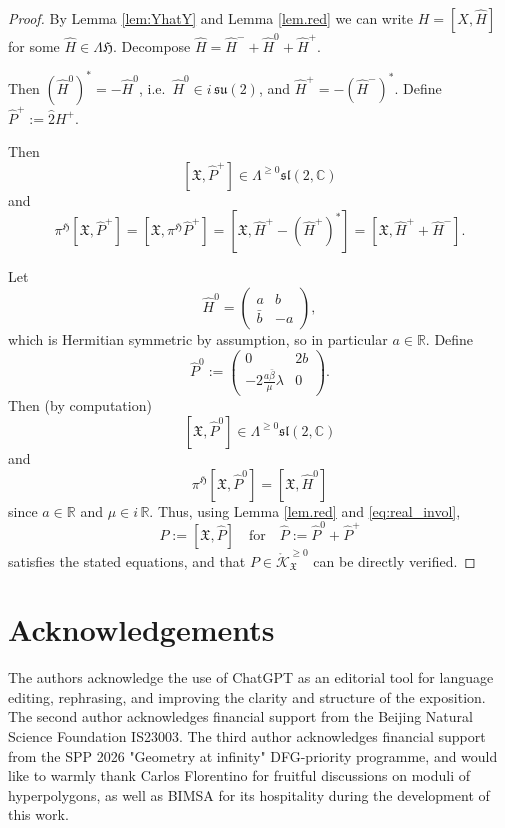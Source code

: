 \documentclass[12pt,a4paper]{amsart}
\theoremstyle{definition}
\theoremstyle{remark}
\newcommand{\R}{\mathbb R}
\newcommand{\C}{\mathbb C}
\begin{document}
\begin{proof}
By Lemma \ref{lem:YhatY} and Lemma \ref{lem.red} we can 
write $H=[X,\hat H]$ for some $\hat H\in\Lambda\mathfrak H.$
Decompose
$\hat H=\hat H^-+\hat H^0+\hat H^+$.


Then $(\hat H^0)^*=-\hat H^0$, i.e.\ $\hat H^0\in i\,\mathfrak{su}(2)$, and
$\hat H^+=-(\hat H^-)^*$.
Define $\hat P^+:=\hat 2H^+$.

Then 
\[
[\mathfrak X,\hat P^+]\in\Lambda^{\geq0}\mathfrak{sl}(2,\C)
\]
and
\[\pi^\mathfrak H[\mathfrak X,\hat P^+]=[\mathfrak X,\pi^\mathfrak H\hat P^+]=[\mathfrak X,\hat H^+- (\hat H^+)^*]=[\mathfrak X,\hat H^+ +\hat H^-].\]

Let
\[
\hat H^0=
\begin{pmatrix}
a & b \\
\bar b & -a
\end{pmatrix},
\]
which is Hermitian symmetric by assumption, so in particular $a\in\R$.
Define
\[
\hat P^0
:=
\begin{pmatrix}
0 & 2b \\
-2\frac{a\bar\beta}{\mu}\lambda & 0
\end{pmatrix}.
\]
Then (by computation)
\[
[\mathfrak X,\hat P^0]\in \Lambda^{\geq0}\mathfrak{sl}(2,\C)
\]
and
\[\pi^\mathfrak H [\mathfrak X,\hat P^0]=[\mathfrak X,\hat H^0]\]
since $a\in\R$ and $\mu\in i\,\R$.
Thus, using Lemma  \ref{lem.red} and \eqref{eq:real_invol},
\[
P:=[\mathfrak X,\hat P]\quad \text{for}\quad \hat P:=\hat P^0+\hat P^+
\]
satisfies the stated equations, and that $P\in\mathring{\mathcal K}^{\geq0}_{\mathfrak X}$
can be directly verified.
\end{proof}








\section*{Acknowledgements}{\small
The authors acknowledge the use of ChatGPT as an editorial tool for language editing,
rephrasing, and improving the clarity and structure of the exposition.
The second author acknowledges financial support from the Beijing Natural Science Foundation
IS23003. The third author acknowledges financial support from the SPP 2026 "Geometry at infinity" 
DFG-priority programme, and would like to warmly thank Carlos Florentino for fruitful
discussions on moduli of hyperpolygons, as well as BIMSA for its hospitality during the development of this work.}
\end{document}
